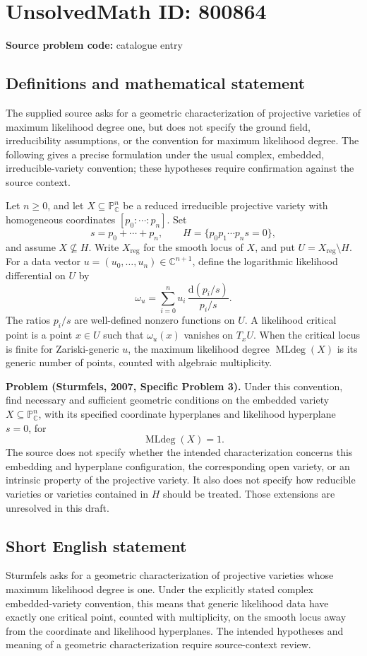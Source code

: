 \documentclass[11pt]{article}
\newcommand{\C}{\mathbb{C}}
\newcommand{\PP}{\mathbb{P}}
\begin{document}
\section*{UnsolvedMath ID: 800864}
\textbf{Source problem code:} catalogue entry
\subsection{Definitions and mathematical statement}
The supplied source asks for a geometric characterization of projective varieties of maximum likelihood degree one, but does not specify the ground field, irreducibility assumptions, or the convention for maximum likelihood degree. The following gives a precise formulation under the usual complex, embedded, irreducible-variety convention; these hypotheses require confirmation against the source context.

Let \(n\geq 0\), and let \(X\subseteq\PP^n_{\C}\) be a reduced irreducible projective variety with homogeneous coordinates \([p_0:\cdots:p_n]\). Set
\[
 s=p_0+\cdots+p_n,\qquad
 H=\{p_0p_1\cdots p_n s=0\},
\]
and assume \(X\not\subseteq H\). Write \(X_{\mathrm{reg}}\) for the smooth locus of \(X\), and put \(U=X_{\mathrm{reg}}\setminus H\). For a data vector \(u=(u_0,\ldots,u_n)\in\C^{n+1}\), define the logarithmic likelihood differential on \(U\) by
\[
 \omega_u=\sum_{i=0}^{n}u_i\,\frac{\mathrm d(p_i/s)}{p_i/s}.
\]
The ratios \(p_i/s\) are well-defined nonzero functions on \(U\). A likelihood critical point is a point \(x\in U\) such that \(\omega_u(x)\) vanishes on \(T_xU\). When the critical locus is finite for Zariski-generic \(u\), the maximum likelihood degree \(\operatorname{MLdeg}(X)\) is its generic number of points, counted with algebraic multiplicity.

\textbf{Problem (Sturmfels, 2007, Specific Problem 3).} Under this convention, find necessary and sufficient geometric conditions on the embedded variety \(X\subseteq\PP^n_{\C}\), with its specified coordinate hyperplanes and likelihood hyperplane \(s=0\), for
\[
 \operatorname{MLdeg}(X)=1.
\]
The source does not specify whether the intended characterization concerns this embedding and hyperplane configuration, the corresponding open variety, or an intrinsic property of the projective variety. It also does not specify how reducible varieties or varieties contained in \(H\) should be treated. Those extensions are unresolved in this draft.
\subsection{Short English statement}
Sturmfels asks for a geometric characterization of projective varieties whose maximum likelihood degree is one. Under the explicitly stated complex embedded-variety convention, this means that generic likelihood data have exactly one critical point, counted with multiplicity, on the smooth locus away from the coordinate and likelihood hyperplanes. The intended hypotheses and meaning of a geometric characterization require source-context review.
\end{document}
